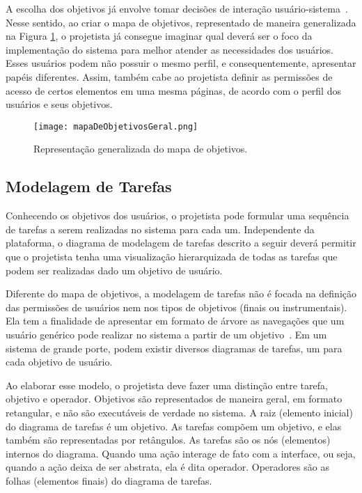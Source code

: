 \indent A escolha dos objetivos já envolve tomar decisões de interação usuário-sistema~\cite{IHCbook}. Nesse sentido, ao criar o mapa de objetivos, representado de maneira generalizada na Figura \ref{fig:mapaDeObjetivosGeral}, o projetista já consegue imaginar qual deverá ser o foco da implementação do sistema para melhor atender as necessidades dos usuários. Esses usuários podem não possuir o mesmo perfil, e consequentemente, apresentar papéis diferentes. Assim, também cabe ao projetista definir as permissões de acesso de certos elementos em uma mesma páginas, de acordo com o perfil dos usuários e seus objetivos.

\begin{figure}[!h]
    \centering
    \texttt{[image: mapaDeObjetivosGeral.png]}
    \caption{Representação generalizada do mapa de objetivos.}
    \label{fig:mapaDeObjetivosGeral}
\end{figure} 

\subsection{Modelagem de Tarefas}

\indent Conhecendo os objetivos dos usuários, o projetista pode formular uma sequência de tarefas a serem realizadas no sistema para cada um. Independente da plataforma, o diagrama de modelagem de tarefas descrito a seguir deverá permitir que o projetista tenha uma visualização hierarquizada de todas as tarefas que podem ser realizadas dado um objetivo de usuário.

\indent Diferente do mapa de objetivos, a modelagem de tarefas não é focada na definição das permissões de usuários nem nos tipos de objetivos (finais ou instrumentais). Ela tem a finalidade de apresentar em formato de árvore as navegações que um usuário genérico pode realizar no sistema a partir de um objetivo~\cite{IHCbook}. Em um sistema de grande porte, podem existir diversos diagramas de tarefas, um para cada objetivo de usuário. 

\indent Ao elaborar esse modelo, o projetista deve fazer uma distinção entre tarefa, objetivo e operador. Objetivos são representados de maneira geral, em formato retangular, e não são executáveis de verdade no sistema. A raiz (elemento inicial) do diagrama de tarefas é um objetivo. As tarefas compõem um objetivo, e elas também são representadas por retângulos. As tarefas são os nós (elementos) internos do diagrama. Quando uma ação interage de fato com a interface, ou seja, quando a ação deixa de ser abstrata, ela é dita operador. Operadores são as folhas (elementos finais) do diagrama de tarefas.


